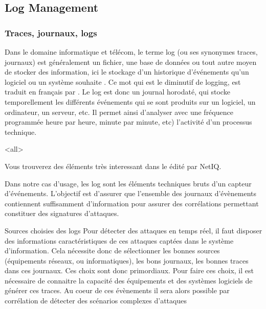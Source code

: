 
\subsection{Log Management }

\subsubsection{Traces, journaux, logs}

Dans le domaine informatique et télécom, le terme log (ou ses synonymes traces, journaux) est généralement un fichier, une base de données ou tout autre moyen de stocker des information, ici le stockage d'un historique d'événements qu'un logiciel ou un système souhaite . 
Ce mot qui est le diminutif  de logging, est traduit en français par . Le log est donc un journal horodaté, qui stocke temporellement les différents événements qui se sont produits sur un  logiciel, un ordinateur, un serveur, etc. Il permet ainsi d'analyser avec une fréquence programmée heure par heure,  minute par minute, etc) l'activité  d'un processus technique.  


\mode<all>{}

Vous trouverez des éléments très interessant  dans le 
 édité par NetIQ.

Dans notre cas d'usage, les log sont les éléments techniques  bruts d'un capteur d'événements. L'objectif est d'assurer que l'ensemble des journaux d'évènements contiennent suffisamment d'information pour assurer des corrélations permettant  constituer des signatures d'attaques. 

\begin{notebox}{Sources choisies des logs }
Pour détecter des attaques en temps réel, il faut disposer des informations caractéristiques de ces attaques captées dans le système d'information. Cela nécessite donc de sélectionner les bonnes sources (équipements réseaux, ou informatiques), les bons journaux, les bonnes traces dans ces journaux.  Ces choix sont donc primordiaux. Pour faire ces choix, il est nécessaire de connaitre la capacité des équipements et des systèmes logiciels de générer ces traces. Au coeur de ces évènements il sera alors possible par corrélation de détecter des scénarios complexes d'attaques
\end{notebox} 

